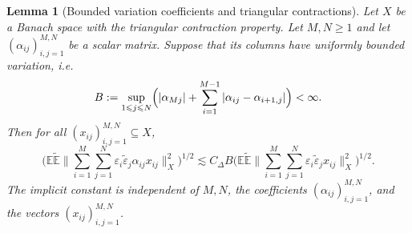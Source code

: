 \documentclass{amsart}
\let\leq\leqslant
\let\geq\geqslant
\theoremstyle{plain}
\theoremstyle{remark}
\theoremstyle{plain}
\newtheorem{lemma}[theorem]{Lemma}
\numberwithin{equation}{section}
\newcommand{\E}{\mathbb E}
\newcommand{\1}{\mathbf 1}
\newcommand{\wt}{\widetilde}
\begin{document}
\begin{lemma}[Bounded variation coefficients and triangular contractions]
\label{lem:BV-triangular-contraction}
Let $X$ be a Banach space with the triangular contraction property.
Let $M,N\geq1$ and let $(\alpha_{ij})_{i,j= 1}^{M,N}$ be a
scalar matrix. Suppose that its columns have uniformly bounded variation, i.e.
\[
    B:=\sup_{1\leq j\leq N}\Bigl(|\alpha_{Mj}|+\sum_{i=1}^{M-1}|\alpha_{ij}-\alpha_{i+1,j}|\Bigr) <\infty .
\]
Then for all $(x_{ij})_{i,j=1}^{M,N}\subseteq X$,
\[
    \Big(\E\wt{\E} \Big\| \sum_{i=1}^M\sum_{j=1}^N          \varepsilon_i\wt{\varepsilon}_j \alpha_{ij}x_{ij} \Big\|_X^2 \Big)^{1/2} \lesssim    C_\Delta B \Big( \E\wt{\E} \Big\|\sum_{i=1}^M\sum_{j=1}^N \varepsilon_i\wt{\varepsilon}_j x_{ij} \Big\|_X^2
    \Big)^{1/2}.
\]
The implicit constant is independent of $M,N$, the coefficients
 $(\alpha_{ij})_{i,j= 1}^{M,N}$, and the vectors $(x_{ij})_{i,j=1}^{M,N}$.
\end{lemma}
\end{document}
